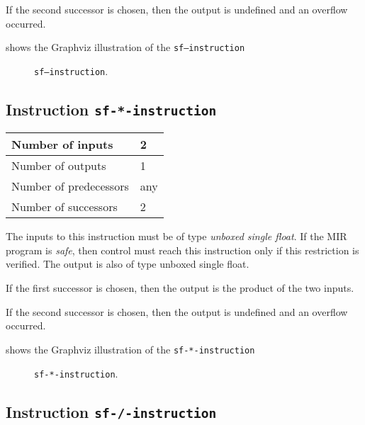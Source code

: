 If the second successor is chosen, then the output is undefined and an
overflow occurred. 

 shows the Graphviz illustration of the
\texttt{sf---instruction}

\begin{figure}
\begin{center}
\end{center}
\caption{\label{fig-sf---instruction}
\texttt{sf---instruction}.}
\end{figure}

\subsection{Instruction \texttt{sf-*-instruction}}
\label{mir-instruction-sf-*}

\begin{tabular}{|l|l|}
\hline
Number of inputs & 2\\
\hline
Number of outputs & 1\\
\hline
Number of predecessors & any\\
\hline
Number of successors & 2\\
\hline
\end{tabular}

The inputs to this instruction must be of type \emph{unboxed single
  float}.  If the MIR program is \emph{safe}, then control must reach
this instruction only if this restriction is verified.  The output is
also of type unboxed single float.

If the first successor is chosen, then the output is
the product of the two inputs.  

If the second successor is chosen, then the output is undefined and an
overflow occurred. 

 shows the Graphviz illustration of the
\texttt{sf-*-instruction}

\begin{figure}
\begin{center}
\end{center}
\caption{\label{fig-sf-*-instruction}
\texttt{sf-*-instruction}.}
\end{figure}

\subsection{Instruction \texttt{sf-/-instruction}}
\label{mir-instruction-sf-/}

